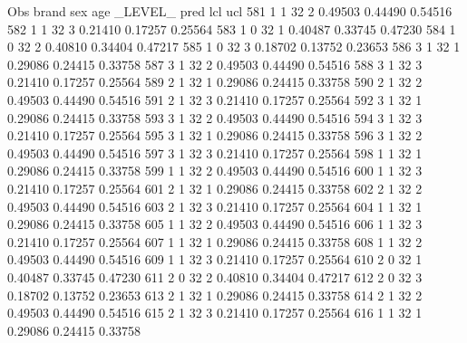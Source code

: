 \documentclass{article}
\begin{document}
\begin{Woutput}
 Obs    brand    sex    age    _LEVEL_      pred       lcl        ucl
 581      1       1      32       2       0.49503    0.44490    0.54516
 582      1       1      32       3       0.21410    0.17257    0.25564
 583      1       0      32       1       0.40487    0.33745    0.47230
 584      1       0      32       2       0.40810    0.34404    0.47217
 585      1       0      32       3       0.18702    0.13752    0.23653
 586      3       1      32       1       0.29086    0.24415    0.33758
 587      3       1      32       2       0.49503    0.44490    0.54516
 588      3       1      32       3       0.21410    0.17257    0.25564
 589      2       1      32       1       0.29086    0.24415    0.33758
 590      2       1      32       2       0.49503    0.44490    0.54516
 591      2       1      32       3       0.21410    0.17257    0.25564
 592      3       1      32       1       0.29086    0.24415    0.33758
 593      3       1      32       2       0.49503    0.44490    0.54516
 594      3       1      32       3       0.21410    0.17257    0.25564
 595      3       1      32       1       0.29086    0.24415    0.33758
 596      3       1      32       2       0.49503    0.44490    0.54516
 597      3       1      32       3       0.21410    0.17257    0.25564
 598      1       1      32       1       0.29086    0.24415    0.33758
 599      1       1      32       2       0.49503    0.44490    0.54516
 600      1       1      32       3       0.21410    0.17257    0.25564
 601      2       1      32       1       0.29086    0.24415    0.33758
 602      2       1      32       2       0.49503    0.44490    0.54516
 603      2       1      32       3       0.21410    0.17257    0.25564
 604      1       1      32       1       0.29086    0.24415    0.33758
 605      1       1      32       2       0.49503    0.44490    0.54516
 606      1       1      32       3       0.21410    0.17257    0.25564
 607      1       1      32       1       0.29086    0.24415    0.33758
 608      1       1      32       2       0.49503    0.44490    0.54516
 609      1       1      32       3       0.21410    0.17257    0.25564
 610      2       0      32       1       0.40487    0.33745    0.47230
 611      2       0      32       2       0.40810    0.34404    0.47217
 612      2       0      32       3       0.18702    0.13752    0.23653
 613      2       1      32       1       0.29086    0.24415    0.33758
 614      2       1      32       2       0.49503    0.44490    0.54516
 615      2       1      32       3       0.21410    0.17257    0.25564
 616      1       1      32       1       0.29086    0.24415    0.33758

\end{Woutput}
\end{document}
